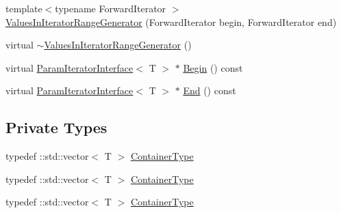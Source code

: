 \begin{DoxyCompactItemize}
\item 
{\footnotesize template$<$typename Forward\+Iterator $>$ }\\\mbox{\hyperlink{classtesting_1_1internal_1_1_values_in_iterator_range_generator_a8b30f6028bc5739bbd7c24b0f0e409f7}{Values\+In\+Iterator\+Range\+Generator}} (Forward\+Iterator begin, Forward\+Iterator end)
\item 
virtual \mbox{\hyperlink{classtesting_1_1internal_1_1_values_in_iterator_range_generator_ab921d9574baa83a8d081f05aa2ebeaa4}{$\sim$\+Values\+In\+Iterator\+Range\+Generator}} ()
\item 
virtual \mbox{\hyperlink{classtesting_1_1internal_1_1_param_iterator_interface}{Param\+Iterator\+Interface}}$<$ T $>$ $\ast$ \mbox{\hyperlink{classtesting_1_1internal_1_1_values_in_iterator_range_generator_a91dac42f069cd06d05348fe5dd78639b}{Begin}} () const
\item 
virtual \mbox{\hyperlink{classtesting_1_1internal_1_1_param_iterator_interface}{Param\+Iterator\+Interface}}$<$ T $>$ $\ast$ \mbox{\hyperlink{classtesting_1_1internal_1_1_values_in_iterator_range_generator_a4af95b9eccfc86c40a715df2d9d0df40}{End}} () const
\end{DoxyCompactItemize}
\subsection*{Private Types}
\begin{DoxyCompactItemize}
\item 
typedef \+::std\+::vector$<$ T $>$ \mbox{\hyperlink{classtesting_1_1internal_1_1_values_in_iterator_range_generator_afab6b799a125b471a8784ced9cf7335c}{Container\+Type}}
\item 
typedef \+::std\+::vector$<$ T $>$ \mbox{\hyperlink{classtesting_1_1internal_1_1_values_in_iterator_range_generator_afab6b799a125b471a8784ced9cf7335c}{Container\+Type}}
\item 
typedef \+::std\+::vector$<$ T $>$ \mbox{\hyperlink{classtesting_1_1internal_1_1_values_in_iterator_range_generator_afab6b799a125b471a8784ced9cf7335c}{Container\+Type}}
\end{DoxyCompactItemize}
